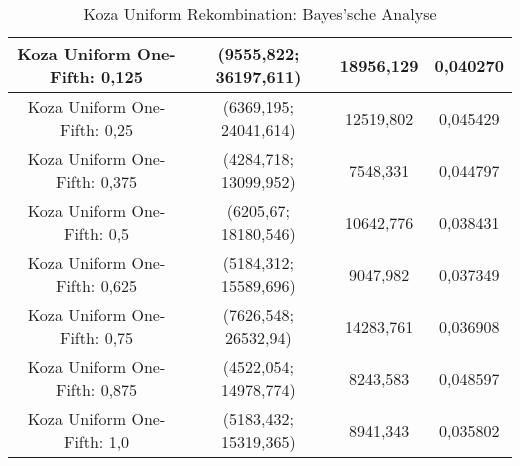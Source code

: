 \begin{table}[H]
\begin{tabular}{c | c | c | c}
		\hline
		\hline
		Koza Uniform One-Fifth: 0,125 & (\color{red}9555,822\color{black}; \color{red}36197,611\color{black}) & \color{red}18956,129\color{black} & 0,040270\\
		\hline
		Koza Uniform One-Fifth: 0,25 & (6369,195; 24041,614) & 12519,802 & 0,045429\\
		\hline
		Koza Uniform One-Fifth: 0,375 & (4284,718; 13099,952) & 7548,331 & 0,044797\\
		\hline
		Koza Uniform One-Fifth: 0,5 & (6205,67; 18180,546) & 10642,776 & 0,038431\\
		\hline
		Koza Uniform One-Fifth: 0,625 & (5184,312; 15589,696) & 9047,982 & 0,037349\\
		\hline
		Koza Uniform One-Fifth: 0,75 & (7626,548; 26532,94) & 14283,761 & \color{red}0,036908\color{black}\\
		\hline
		Koza Uniform One-Fifth: 0,875 & (4522,054; 14978,774) & 8243,583 & 0,048597\\
		\hline
		Koza Uniform One-Fifth: 1,0 & (5183,432; 15319,365) & 8941,343 & \color{red}0,035802\color{black}\\
	\end{tabular}
	\caption{Koza Uniform Rekombination: Bayes'sche Analyse}
	\label{table:kozaUniformBayesian}
\end{table}


